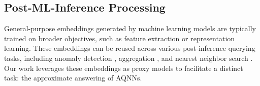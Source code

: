 
\subsection{Post-ML-Inference Processing}
General-purpose embeddings generated by machine learning models are typically trained on broader objectives, such as feature extraction or representation learning. These embeddings can be reused across various post-inference querying tasks, including anomaly detection \cite{DBLP:conf/sigmod/BreunigKNS00}, aggregation \cite{DBLP:journals/corr/abs-1301-3781, DBLP:conf/naacl/DevlinCLT19}, and nearest neighbor search \cite{DujianPQA, DBLP:journals/pvldb/KangGBHZ20}. Our work leverages these embeddings as proxy models to facilitate a distinct task: the approximate answering of AQNNs.